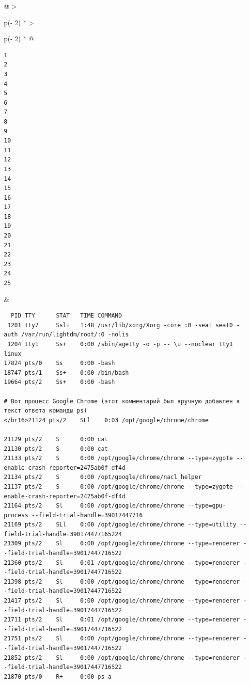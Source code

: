 \documentclass{article}
\begin{document}
\begin{longtable}[]{@{}
  >{\raggedright\arraybackslash}p{(\columnwidth - 2\tabcolsep) * }
  >{\raggedright\arraybackslash}p{(\columnwidth - 2\tabcolsep) * }@{}}
\toprule
\endhead
\begin{minipage}[t]{\linewidth}\raggedright
\begin{verbatim}
1
2
3
4
5
6
7
8
9
10
11
12
13
14
15
16
17
18
19
20
21
22
23
24
25
\end{verbatim}
\end{minipage} & \begin{minipage}[t]{\linewidth}\raggedright
\begin{verbatim}
  PID TTY      STAT   TIME COMMAND
 1201 tty7     Ssl+   1:48 /usr/lib/xorg/Xorg -core :0 -seat seat0 -auth /var/run/lightdm/root/:0 -nolis
 1204 tty1     Ss+    0:00 /sbin/agetty -o -p -- \u --noclear tty1 linux
17824 pts/0    Ss     0:00 -bash
18747 pts/1    Ss+    0:00 /bin/bash
19664 pts/2    Ss+    0:00 -bash

# Вот процесс Google Chrome (этот комментарий был вручную добавлен в текст ответа команды ps)
</br16>21124 pts/2    SLl    0:03 /opt/google/chrome/chrome

21129 pts/2    S      0:00 cat
21130 pts/2    S      0:00 cat
21133 pts/2    S      0:00 /opt/google/chrome/chrome --type=zygote --enable-crash-reporter=2475ab0f-df4d
21134 pts/2    S      0:00 /opt/google/chrome/nacl_helper
21137 pts/2    S      0:00 /opt/google/chrome/chrome --type=zygote --enable-crash-reporter=2475ab0f-df4d
21164 pts/2    Sl     0:00 /opt/google/chrome/chrome --type=gpu-process --field-trial-handle=39017447716
21169 pts/2    SLl    0:00 /opt/google/chrome/chrome --type=utility --field-trial-handle=390174477165224
21309 pts/2    Sl     0:00 /opt/google/chrome/chrome --type=renderer --field-trial-handle=39017447716522
21360 pts/2    Sl     0:01 /opt/google/chrome/chrome --type=renderer --field-trial-handle=39017447716522
21398 pts/2    Sl     0:00 /opt/google/chrome/chrome --type=renderer --field-trial-handle=39017447716522
21417 pts/2    Sl     0:00 /opt/google/chrome/chrome --type=renderer --field-trial-handle=39017447716522
21711 pts/2    Sl     0:01 /opt/google/chrome/chrome --type=renderer --field-trial-handle=39017447716522
21751 pts/2    Sl     0:00 /opt/google/chrome/chrome --type=renderer --field-trial-handle=39017447716522
21852 pts/2    Sl     0:00 /opt/google/chrome/chrome --type=renderer --field-trial-handle=39017447716522
21870 pts/0    R+     0:00 ps a
\end{verbatim}
\end{minipage} \\ \addlinespace
\bottomrule
\end{longtable}
\end{document}
